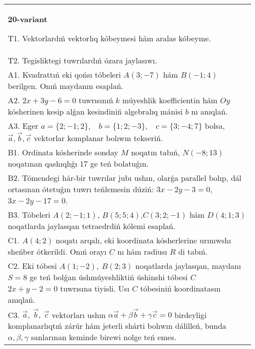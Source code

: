\documentclass{article}
\begin{document}
\begin{tabular}{m{17cm}}
\textbf{20-variant}
\newline

T1. 
Vektorlardıń vektorlıq kóbeymesi hám aralas kóbeyme.
 \\
T2. 
Tegisliktegi tuwrılardıń ózara jaylasıwı.
 \\
A1. 
Kvadrattıń eki qońsı tóbeleri $A(3; -7)$ hám
$B(-1;4)$ berilgen. Onıń maydanın esaplań.
 \\
A2. 
$2x+3y-6=0$ tuwrısınıń $k$ múyeshlik
koefficientin hám $Oy$ kósherinen kesip alǵan kesindiniń algebralıq
mánisi $b$ nı anıqlań.
 \\
A3. 
Eger \(a = \{ 2; - 1;2\},\ \ \ \ b = \{ 1;2; - 3\},\ \ \ \ c = \{ 3; - 4;7\}\) bolsa, $\overrightarrow{a}, \overrightarrow{b}, \overrightarrow{c}$ vektorlar komplanar bolıwın tekseriń. \\
B1. 
Ordinata kósherinde sonday $M$ noqatın tabıń,
\(N(-8;13)\) noqatınan qashıqlıǵı 17 ge teń bolatuǵın.
 \\
B2. 
Tómendegi hár-bir tuwrılar jubı ushın, olarǵa parallel
bolıp, dál ortasınan ótetuǵın tuwrı teńlemesin dúziń: $3x-2y-3=0$, $3x-2y-17=0$.
 \\
B3. 
Tóbeleri $A (2;-1;1)$, $B (5;5;4)$,$C (3;2;-1)$ hám $D (4;1;3)$ noqatlarda jaylasqan tetraedrdiń kólemi esaplań. \\
C1. \(A(4;2)\) noqatı arqalı, eki koordinata kósherlerine
urınıwshı sheńber ótkerildi. Onıń orayı $C$ nı hám radiusı
$R$ di tabıń.
 \\
C2. Eki tóbesi \(A(1; - 2),\ B(2;3)\) noqatlarda jaylasqan,
maydanı \(S = 8\) ge teń bolǵan úshmúyeshliktiń úshinshi tóbesi
$C$ \(2x + y - 2 = 0\) tuwrısına tiyisli. Usı $C$ tóbesiniń
koordinatasın anıqlań.
 \\
C3. 
\(\vec{a},\ \vec{b},\ \vec{c}\) vektorları ushın \(\alpha\vec{a} + \beta\vec{b} + \gamma\vec{c} = 0\) birdeyligi komplanarlıqtıń zárúr hám jeterli shárti bolıwın dálilleń, bunda \(\alpha,\beta,\gamma\) sanlarınan keminde birewi nolge teń emes. \\

\end{tabular}
\vspace{1cm}
\end{document}
